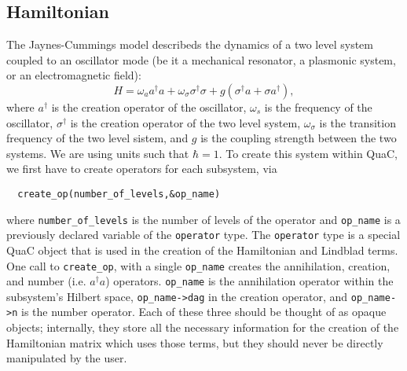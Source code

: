 \documentclass{article}
\begin{document}
\subsection{Hamiltonian}
The Jaynes-Cummings model describeds the dynamics of
a two level system coupled to an oscillator mode (be it a mechanical resonator, a
plasmonic system, or an electromagnetic field):
\begin{equation}\label{jc_ham}
  H =  \omega_a a^\dagger a +  \omega_\sigma \sigma^\dagger \sigma +
   g (\sigma^\dagger a + \sigma a^\dagger),
\end{equation}
where $a^\dagger$ is the creation operator of the oscillator, $\omega_s$ is the frequency
of the oscillator, $\sigma^\dagger$ is the creation operator of the two level system,
$\omega_\sigma$ is the transition frequency of the two level sistem, and $g$ is the
coupling strength between the two systems. We are using units such that $\hbar = 1$.
To create this system within QuaC, we first
have to create operators for each subsystem, via
\begin{lstlisting}
  create_op(number_of_levels,&op_name)
\end{lstlisting}
where \texttt{number\_of\_levels} is the number of levels of the operator and \texttt{op\_name}
is a previously declared variable of the \texttt{operator} type. The \texttt{operator} type
is a special QuaC object that is used in the creation of the Hamiltonian and Lindblad terms.
One call to \texttt{create\_op}, with a single \texttt{op\_name} creates the annihilation,
creation, and number (i.e. $a^\dagger a$) operators.
\texttt{op\_name} is the annihilation operator within the subsystem's Hilbert space,
\texttt{op\_name->dag} in the creation operator, and \texttt{op\_name->n} is the number operator.
Each of these three should be thought of as opaque objects; internally, they store
all the necessary information
for the creation of the Hamiltonian matrix which uses those terms,
but they should never be directly manipulated by the
user.
\end{document}
